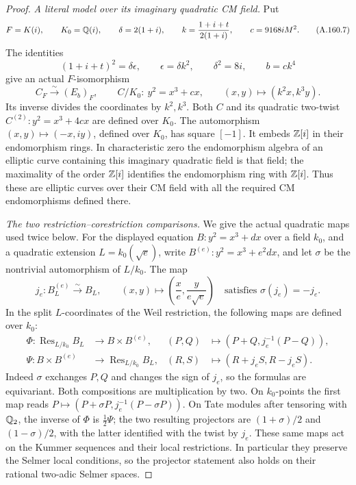 \begin{proof}
\emph{A literal model over its imaginary quadratic CM field.}
Put
\[
 F=K(i),\qquad K_0=\mathbb Q(i),\qquad
 \delta=2(1+i),\qquad k=\frac{1+i+t}{2(1+i)},\qquad
 c=9168iM^2.
\tag{A.160.7}
\]
The identities
\[
 (1+i+t)^2=\delta\epsilon,\qquad
 \epsilon=\delta k^2,\qquad \delta^2=8i,\qquad b=ck^4
\tag{A.160.8}
\]
give an actual \(F\)-isomorphism
\[
 C_F\xrightarrow{\sim}(E_b)_F,\qquad
 C/K_0:\ y^2=x^3+cx,\qquad (x,y)\longmapsto(k^2x,k^3y).
\tag{A.160.9}
\]
Its inverse divides the coordinates by \(k^2,k^3\).
Both \(C\) and its quadratic two-twist
\(C^{(2)}:y^2=x^3+4cx\) are defined over \(K_0\).
The automorphism \((x,y)\mapsto(-x,iy)\), defined over
\(K_0\), has square \([-1]\).  It embeds \(\mathbb Z[i]\) in
their endomorphism rings.  In characteristic zero the
endomorphism algebra of an elliptic curve containing this
imaginary quadratic field is that field; the maximality of
the order \(\mathbb Z[i]\) identifies the endomorphism ring with
\(\mathbb Z[i]\).  Thus these are elliptic curves over their CM
field with all the required CM endomorphisms defined there.

\emph{The two restriction--corestriction comparisons.}
We give the actual quadratic maps used twice below.
For the displayed equation \(B:y^2=x^3+dx\) over a field
\(k_0\), and a quadratic extension \(L=k_0(\sqrt e)\),
write \(B^{(e)}:y^2=x^3+e^2dx\), and let \(\sigma\)
be the nontrivial automorphism of \(L/k_0\).  The map
\[
 j_e:B^{(e)}_L\xrightarrow{\sim}B_L,
       \qquad (x,y)\longmapsto
                  \left(\frac{x}{e},\frac{y}{e\sqrt e}\right)
       \quad\text{satisfies }\sigma(j_e)=-j_e.
\tag{A.160.10}
\]
In the split \(L\)-coordinates of the Weil restriction,
the following maps are defined over \(k_0\):
\[
 \begin{aligned}
 \Phi:\operatorname{Res}_{L/k_0}B_L&\longrightarrow
                                  B\times B^{(e)},
     &(P,Q)&\longmapsto(P+Q,j_e^{-1}(P-Q)),\\
 \Psi:B\times B^{(e)}&\longrightarrow
                                  \operatorname{Res}_{L/k_0}B_L,
     &(R,S)&\longmapsto(R+j_eS,R-j_eS).
 \end{aligned}
\tag{A.160.11}
\]
Indeed \(\sigma\) exchanges \(P,Q\) and changes the sign
of \(j_e\), so the formulas are equivariant.  Both
compositions are multiplication by two.  On \(k_0\)-points
the first map reads
\(P\mapsto(P+\sigma P,j_e^{-1}(P-\sigma P))\).
On Tate modules after tensoring with \(\mathbb Q_2\), the inverse
of \(\Phi\) is \(\frac12\Psi\); the two resulting
projectors are \((1+\sigma)/2\) and \((1-\sigma)/2\),
with the latter identified with the twist by \(j_e\).
These same maps act on the Kummer sequences and their local
restrictions.  In particular they preserve the Selmer local
conditions, so the projector statement also holds on their
rational two-adic Selmer spaces.


\end{proof}
